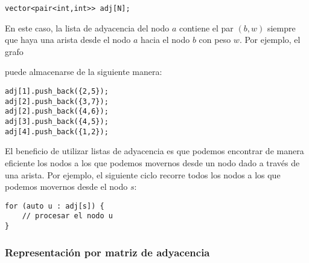 \begin{lstlisting}
vector<pair<int,int>> adj[N];
\end{lstlisting}

En este caso, la lista de adyacencia del nodo $a$
contiene el par $(b,w)$
siempre que haya una arista desde el nodo $a$ hacia el nodo $b$
con peso $w$. Por ejemplo, el grafo

\begin{center}
\end{center}
puede almacenarse de la siguiente manera:
\begin{lstlisting}
adj[1].push_back({2,5});
adj[2].push_back({3,7});
adj[2].push_back({4,6});
adj[3].push_back({4,5});
adj[4].push_back({1,2});
\end{lstlisting}

El beneficio de utilizar listas de adyacencia es que
podemos encontrar de manera eficiente los nodos a los que
podemos movernos desde un nodo dado a través de una arista.
Por ejemplo, el siguiente ciclo recorre todos los nodos
a los que podemos movernos desde el nodo $s$:

\begin{lstlisting}
for (auto u : adj[s]) {
    // procesar el nodo u
}
\end{lstlisting}

\subsubsection{Representación por matriz de adyacencia}


